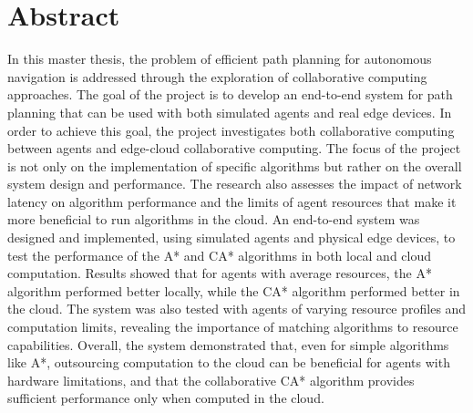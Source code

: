 \chapter{Abstract}
In this master thesis, the problem of efficient path planning for autonomous navigation is addressed through the exploration of collaborative computing approaches. The goal of the project is to develop an end-to-end system for path planning that can be used with both simulated agents and real edge devices. In order to achieve this goal, the project investigates both collaborative computing between agents and edge-cloud collaborative computing. The focus of the project is not only on the implementation of specific algorithms but rather on the overall system design and performance. The research also assesses the impact of network latency on algorithm performance and the limits of agent resources that make it more beneficial to run algorithms in the cloud. An end-to-end system was designed and implemented, using simulated agents and physical edge devices, to test the performance of the A* and CA* algorithms in both local and cloud computation. Results showed that for agents with average resources, the A* algorithm performed better locally, while the CA* algorithm performed better in the cloud. The system was also tested with agents of varying resource profiles and computation limits, revealing the importance of matching algorithms to resource capabilities. Overall, the system demonstrated that, even for simple algorithms like A*, outsourcing computation to the cloud can be beneficial for agents with hardware limitations, and that the collaborative CA* algorithm provides sufficient performance only when computed in the cloud.

